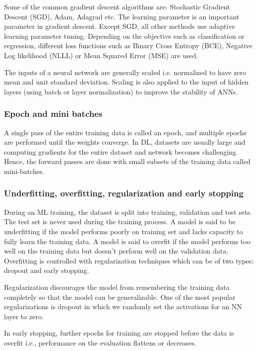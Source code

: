 \documentclass[pdflatex,sn-mathphys]{sn-jnl}%
\theoremstyle{thmstyleone}%
\theoremstyle{thmstyletwo}%
\theoremstyle{thmstylethree}%
\begin{document}
Some of the common gradient descent algorithms are: Stochastic Gradient Descent (SGD), Adam, Adagrad etc.   The learning parameter is an important parameter in gradient descent. Except SGD, all other methods use adaptive learning parameter tuning. Depending on the objective such as classification or regression, different loss functions such as Binary Cross Entropy (BCE), Negative Log likelihood (NLLL) or Mean Squared Error (MSE) are used.

The inputs of a neural network are generally scaled i.e. normalized to have zero mean and unit standard deviation. Scaling is also applied to the input of hidden layers (using batch or layer normalization) to improve the stability of ANNs. 

\subsubsection{Epoch and mini batches}
A single pass of the entire training data is called an epoch, and multiple epochs are performed until the weights converge. In DL, datasets are usually large and computing gradients for the entire dataset and network becomes challenging. Hence, the forward passes are done with small subsets of the training data called mini-batches. 

\subsubsection{Underfitting, overfitting, regularization and early stopping}
During an ML training, the dataset is split into training, validation and test sets. The test set is never used during the training process. A model is said to be underfitting if the model performs poorly on training set and lacks capacity to fully learn the training data. A model is said to overfit if the model performs too well on the training data but doesn't perform well on the validation data. Overfitting is controlled with regularization techniques which can be of two types: dropout and early stopping. 

Regularization discourages the model from remembering the training data completely so that the model can be generalizable. One of the most popular regularizations is dropout in which we randomly set the activations for an NN layer to zero. 

In early stopping, further epochs for training are stopped before the data is overfit i.e., performance on the evaluation flattens or decreases. 
\end{document}

